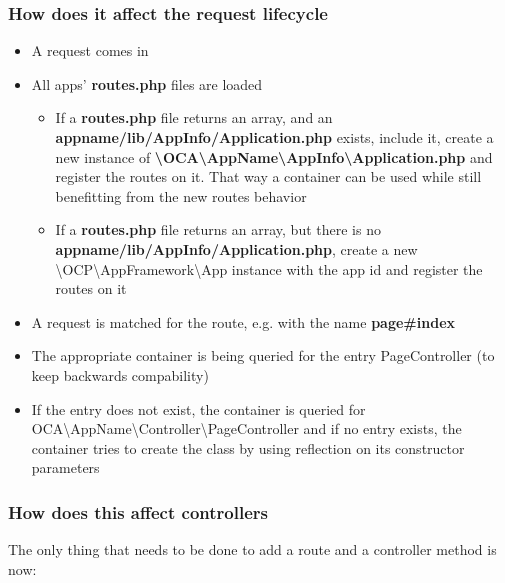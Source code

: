 \documentclass[letterpaper,10pt,english]{sphinxmanual}
\begin{document}
\subsubsection{How does it affect the request lifecycle}
\label{app/container:how-does-it-affect-the-request-lifecycle}\begin{itemize}
\item {} 
A request comes in

\item {} 
All apps' \textbf{routes.php} files are loaded
\begin{itemize}
\item {} 
If a \textbf{routes.php} file returns an array, and an \textbf{appname/lib/AppInfo/Application.php} exists, include it, create a new instance of \textbf{\textbackslash{}OCA\textbackslash{}AppName\textbackslash{}AppInfo\textbackslash{}Application.php} and register the routes on it. That way a container can be used while still benefitting from the new routes behavior

\item {} 
If a \textbf{routes.php} file returns an array, but there is no \textbf{appname/lib/AppInfo/Application.php}, create a new \textbackslash{}OCP\textbackslash{}AppFramework\textbackslash{}App instance with the app id and register the routes on it

\end{itemize}

\item {} 
A request is matched for the route, e.g. with the name \textbf{page\#index}

\item {} 
The appropriate container is being queried for the entry PageController (to keep backwards compability)

\item {} 
If the entry does not exist, the container is queried for OCA\textbackslash{}AppName\textbackslash{}Controller\textbackslash{}PageController and if no entry exists, the container tries to create the class by using reflection on its constructor parameters

\end{itemize}


\subsubsection{How does this affect controllers}
\label{app/container:how-does-this-affect-controllers}
The only thing that needs to be done to add a route and a controller method is now:
\end{document}
